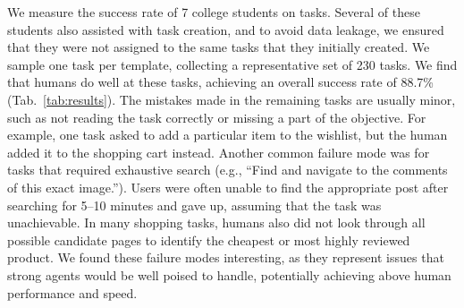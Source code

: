 We measure the success rate of 7 college students on \BenchmarkName{} tasks. Several of these students also assisted with task creation, and to avoid data leakage, we ensured that they were not assigned to the same tasks that they initially created. We sample one task per template, collecting a representative set of 230 tasks. We find that humans do well at these tasks, achieving an overall success rate of 88.7\% (Tab.~\ref{tab:results}). The mistakes made in the remaining tasks are usually minor, such as not reading the task correctly or missing a part of the objective. For example, one task asked to add a particular item to the wishlist, but the human added it to the shopping cart instead. 
Another common failure mode was for tasks that required exhaustive search (e.g., ``Find and navigate to the comments of this exact image.''). Users were often unable to find the appropriate post after searching for 5--10 minutes and gave up, assuming that the task was unachievable. In many shopping tasks, humans also did not look through all possible candidate pages to identify the cheapest or most highly reviewed product. We found these failure modes interesting, as they represent issues that strong agents would be well poised to handle, potentially achieving above human performance and speed.